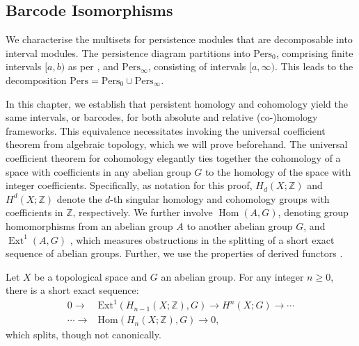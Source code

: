 \subsection{Barcode Isomorphisms}
\label{BarcodeIsomorphisms}
We characterise the multisets for persistence modules that are decomposable into
interval modules. The persistence diagram partitions into $\mathrm{Pers}_{0}$,
comprising finite intervals $[a, b)$ as per \cite[\S 2.3]{de2011dualities}, and $\mathrm{Pers}_{\infty}$, consisting of intervals $[a, \infty)$. This leads to the decomposition
$\mathrm{Pers}= \mathrm{Pers}_{0} \cup \mathrm{Pers}_{\infty}$.

In this chapter, we establish that persistent homology and cohomology yield the
same intervals, or barcodes, for both absolute and relative (co-)homology
frameworks. This equivalence necessitates invoking the universal coefficient theorem
from algebraic topology, which we will prove beforehand. The universal coefficient
theorem for cohomology elegantly ties together the cohomology of a space with coefficients
in any abelian group $G$ to the homology of the space with integer coefficients. Specifically, as notation for this proof, $H_{d}(X;\mathbb{Z})$ and
$H^{d}(X;\mathbb{Z})$ denote the $d$-th singular homology and cohomology groups
with coefficients in $\mathbb{Z}$, respectively. We further involve
$\operatorname{Hom}(A, G)$, denoting group homomorphisms from an abelian group $A$ to another
abelian group $G$, and $\operatorname{Ext}^{1}(A, G)$ \cite[\S 3.1, p. 195]{hatcher2005algebraic}, which measures obstructions
in the splitting of a short exact sequence of abelian groups. Further, we use the
properties of derived functors \cite[\S 2.7]{Weibel1994}.

\begin{theorem}{\cite{hatcher2005algebraic}}
\label{UniversalCoefficientsforCohomology}
Let $X$ be a topological space and $G$ an abelian group. For any integer $n \geq 0$, there is a short exact sequence:
\begin{align}
0 \rightarrow &\text{Ext}^{1}(H_{n-1}(X;\mathbb{Z}), G) \rightarrow H^{n}(X; G) \rightarrow \cdots \\
\cdots \rightarrow &\text{Hom}(H_{n}(X;\mathbb{Z}), G) \rightarrow 0,
\end{align}
which splits, though not canonically.
\end{theorem}

